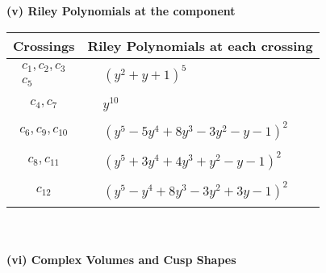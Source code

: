\documentclass[1p]{elsarticle_modified}
\theoremstyle{definition}
\begin{document}
\newpage\renewcommand{\arraystretch}{1}
\flushleft \textbf{(v) Riley Polynomials at the component}\newline \\
\begin{tabular}{m{50pt}|m{274pt}}
Crossings & \hspace{64pt}Riley Polynomials at each crossing \\
\hline $$\begin{aligned}c_{1},c_{2},c_{3}\\c_{5}\end{aligned}$$&$\begin{aligned}
&(y^2+y+1)^5
\end{aligned}$\\
\hline $$\begin{aligned}c_{4},c_{7}\end{aligned}$$&$\begin{aligned}
&y^{10}
\end{aligned}$\\
\hline $$\begin{aligned}c_{6},c_{9},c_{10}\end{aligned}$$&$\begin{aligned}
&(y^5-5 y^4+8 y^3-3 y^2- y-1)^2
\end{aligned}$\\
\hline $$\begin{aligned}c_{8},c_{11}\end{aligned}$$&$\begin{aligned}
&(y^5+3 y^4+4 y^3+y^2- y-1)^2
\end{aligned}$\\
\hline $$\begin{aligned}c_{12}\end{aligned}$$&$\begin{aligned}
&(y^5- y^4+8 y^3-3 y^2+3 y-1)^2
\end{aligned}$\\
\hline
\end{tabular}\\~\\
\newpage\flushleft \textbf{(vi) Complex Volumes and Cusp Shapes}
\end{document}
